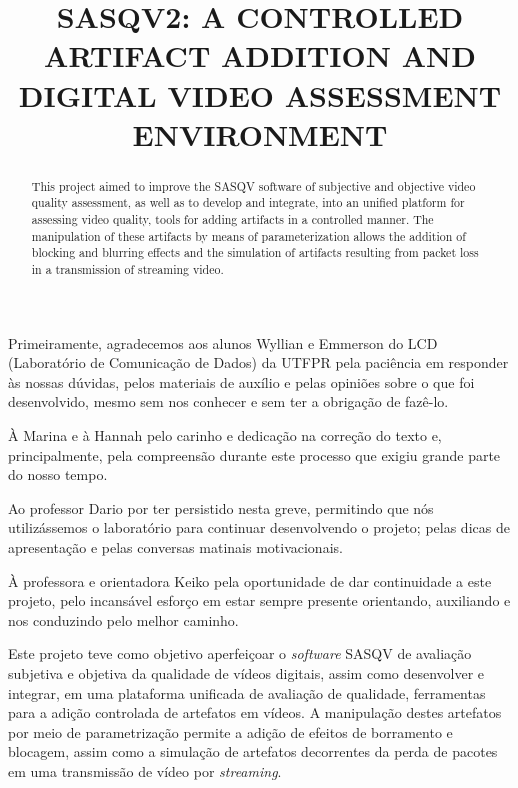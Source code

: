 \documentclass[openright]{normas-utf-tex} %
\title{\MakeUppercase{SASQV2: A controlled artifact addition and digital video assessment environment}} %
\begin{document}
\capa %
\folhaderosto %

\begin{agradecimentos}
Primeiramente, agradecemos aos alunos Wyllian e Emmerson do LCD (Laboratório de Comunicação de Dados) da UTFPR pela paciência em responder às nossas dúvidas, pelos materiais de auxílio e pelas opiniões sobre o que foi desenvolvido, mesmo sem nos conhecer e sem ter a obrigação de fazê-lo.

À Marina e à Hannah pelo carinho e dedicação na correção do texto e, principalmente, pela compreensão durante este processo que exigiu grande parte do nosso tempo.

Ao professor Dario por ter persistido nesta greve, permitindo que nós utilizássemos o laboratório para continuar desenvolvendo o projeto; pelas dicas de apresentação e pelas conversas matinais motivacionais.

À professora e orientadora Keiko pela oportunidade de dar continuidade a este projeto, pelo incansável esforço em estar sempre presente orientando, auxiliando e nos conduzindo pelo melhor caminho.
\end{agradecimentos}

\begin{resumo}
Este projeto teve como objetivo aperfeiçoar o \emph{software} SASQV de avaliação subjetiva e objetiva da qualidade de vídeos digitais, assim como desenvolver e integrar, em uma plataforma unificada de avaliação de qualidade, ferramentas para a adição controlada de artefatos em vídeos. A manipulação destes artefatos por meio de parametrização permite a adição de  efeitos de borramento e blocagem, assim como a simulação de artefatos decorrentes da perda de pacotes em uma transmissão de vídeo por \emph{streaming}.
\end{resumo}

\begin{abstract}
This project aimed to improve the SASQV software of subjective and objective video quality assessment, as well as to develop and integrate, into an unified platform for assessing video quality, tools for adding artifacts in a controlled manner. The manipulation of these artifacts by means of parameterization allows the addition of blocking and blurring effects and the simulation of artifacts resulting from packet loss in a transmission of streaming video.
\end{abstract}
\end{document}
